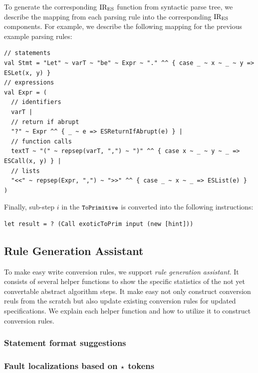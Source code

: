 To generate the corresponding \( \text{IR}_\text{ES} \) function from syntactic parse tree,
we describe the mapping from each parsing rule into the corresponding \( \text{IR}_\text{ES} \) components.
For example, we describe the following mapping for the previous example parsing rules:
\begin{lstlisting}[style=myScalastyle]
// statements
val Stmt = "Let" ~ varT ~ "be" ~ Expr ~ "." ^^ { case _ ~ x ~ _ ~ y => ESLet(x, y) }
// expressions
val Expr = (
  // identifiers
  varT |
  // return if abrupt
  "?" ~ Expr ^^ { _ ~ e => ESReturnIfAbrupt(e) } |
  // function calls
  textT ~ "(" ~ repsep(varT, ",") ~ ")" ^^ { case x ~ _ ~ y ~ _ => ESCall(x, y) } |
  // lists
  "<<" ~ repsep(Expr, ",") ~ ">>" ^^ { case _ ~ x ~ _ => ESList(e) }
)
\end{lstlisting}
Finally, sub-step \( i \) in the \( \texttt{\small ToPrimitive} \) is converted
into the following instructions:
\begin{lstlisting}[style=myCorestyle]
let result = ? (Call exoticToPrim input (new [hint]))
\end{lstlisting}

\subsection{Rule Generation Assistant}

To make easy write conversion rules, we support \textit{rule generation assistant}.
It consists of several helper functions to show the specific statistics of
the not yet convertable abstract algorithm steps. It make easy not only construct
conversion reuls from the scratch but also update existing conversion rules
for updated specifications. We explain each helper function and how to utilize
it to construct conversion rules.

\subsubsection{Statement format suggestions}


\subsubsection{Fault localizations based on \( \star \) tokens}

